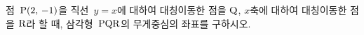 점~$\mathrm{P}(2,\,-1)$을 직선~$y=x$에 대하여 대칭이동한 점을 $\mathrm{Q}$, $x$축에 대하여 대칭이동한 점을 $\mathrm{R}$라 할 때, 삼각형~$\mathrm{PQR}$의 무게중심의 좌표를 구하시오.
